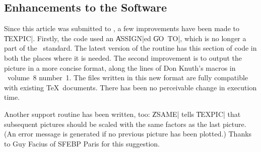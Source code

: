 \subsection*{Enhancements to the Software}

Since this article was submitted to \TUB, a few improvements have been made
to \|TEXPIC|. Firstly, the code used an \|ASSIGN|ed \|GO~TO|, which is no
longer a part of the \FTN\ standard. The latest version of the routine has this
section of code in both the places where it is needed. The second improvement
is to output the picture in a more concise format, along the lines of Don
Knuth's macros in \TUB\ volume~8 number~1. The files written in this new format
are fully compatible with existing \TeX\ documents. There has been no
perceivable change in execution time.

Another support routine has been written, too: \|ZSAME| tells \|TEXPIC| that
subsequent pictures should be scaled with the same factors as the last picture.
(An error message is generated if no previous picture has been plotted.) Thanks
to Guy Facius of SFEBP Paris for this suggestion. 


